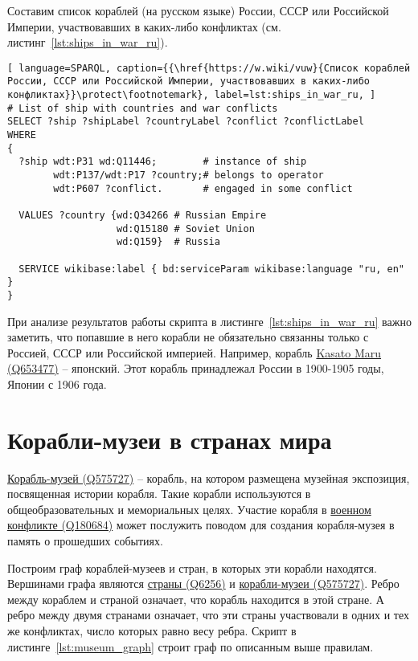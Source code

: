 Составим список кораблей (на русском языке) России, СССР или Российской Империи, участвовавших в каких-либо конфликтах (см. листинг~\ref{lst:ships_in_war_ru}).

\begin{lstlisting}[ language=SPARQL, caption={{\href{https://w.wiki/vuw}{Список кораблей России, СССР или Российской Империи, участвовавших в каких-либо конфликтах}}\protect\footnotemark}, label=lst:ships_in_war_ru, ]
# List of ship with countries and war conflicts
SELECT ?ship ?shipLabel ?countryLabel ?conflict ?conflictLabel
WHERE
{
  ?ship wdt:P31 wd:Q11446;        # instance of ship
        wdt:P137/wdt:P17 ?country;# belongs to operator
        wdt:P607 ?conflict.       # engaged in some conflict
  
  VALUES ?country {wd:Q34266 # Russian Empire
                   wd:Q15180 # Soviet Union
                   wd:Q159}  # Russia

  SERVICE wikibase:label { bd:serviceParam wikibase:language "ru, en" }
}
\end{lstlisting}

При анализе результатов работы скрипта в листинге~\ref{lst:ships_in_war_ru} важно заметить, что попавшие в него корабли не обязательно связанны только с Россией, СССР или Российской империей. Например, корабль \href{https://www.wikidata.org/wiki/Q653477}{Kasato Maru (Q653477)} -- японский. Этот корабль принадлежал России в 1900-1905 годы, Японии с 1906 года.


\section{Корабли-музеи в странах мира}

\href{https://www.wikidata.org/wiki/Q575727}{Корабль-музей (Q575727)} -- корабль, на котором размещена музейная экспозиция, посвященная истории корабля. Такие корабли используются в общеобразовательных и мемориальных целях. Участие корабля в \href{https://www.wikidata.org/wiki/Q180684}{военном конфликте (Q180684)} может послужить поводом для создания корабля-музея в память о прошедших событиях. 

Построим граф кораблей-музеев и стран, в которых эти корабли находятся. Вершинами графа являются \href{https://www.wikidata.org/wiki/Q6256}{страны (Q6256)} и \href{https://www.wikidata.org/wiki/Q575727}{корабли-музеи (Q575727)}. Ребро между кораблем и страной означает, что корабль находится в этой стране. А ребро между двумя странами означает, что эти страны участвовали в одних и тех же конфликтах, число которых равно весу ребра. Скрипт в листинге~\ref{lst:museum_graph} строит граф по описанным выше правилам.

